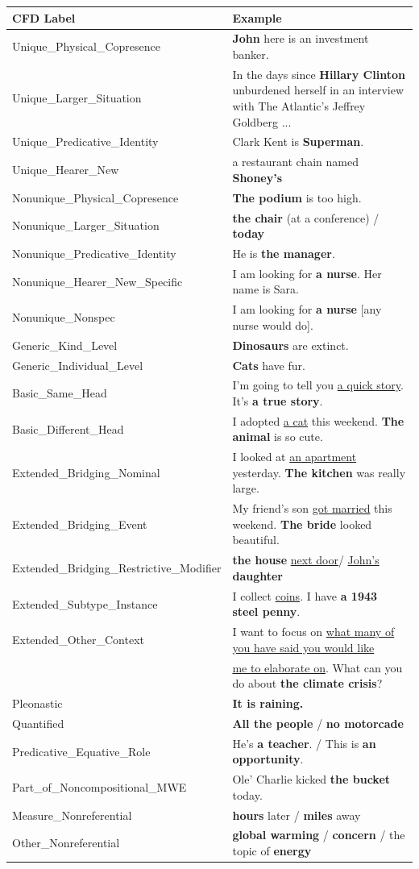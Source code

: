 \documentclass[portrait,final]{baposter}
\begin{document}
\begin{poster}
{\vspace{4pt}
\smaller[.5]
\begin{tabular}{p{19em}p{29em}}
{\bf \normalsize{CFD Label}}&{\bf \normalsize{Example}}\\\hline
Unique\_Physical\_Copresence & {\bf John} here is an investment banker.\\Unique\_Larger\_Situation & In the days since {\bf Hillary Clinton} unburdened herself in an interview with The Atlantic's Jeffrey Goldberg ...\\Unique\_Predicative\_Identity & Clark Kent is {\bf Superman}.\\Unique\_Hearer\_New & a restaurant chain named {\bf Shoney's}\\Nonunique\_Physical\_Copresence & {\bf The podium} is too high.\\Nonunique\_Larger\_Situation & {\bf the chair} (at a conference) / {\bf today}\\Nonunique\_Predicative\_Identity & He is {\bf the manager}.\\Nonunique\_Hearer\_New\_Specific & I am looking for {\bf a nurse}. Her name is Sara.\\Nonunique\_Nonspec & I am looking for {\bf a nurse} [any nurse would do].\\Generic\_Kind\_Level & {\bf Dinosaurs} are extinct.\\Generic\_Individual\_Level & {\bf Cats} have fur.\\Basic\_Same\_Head & I'm going to tell you \underline{a quick story}. It's {\bf a true story}.\\Basic\_Different\_Head & I adopted \underline{a cat} this weekend. {\bf The animal} is so cute.\\Extended\_Bridging\_Nominal & I looked at \underline{an apartment} yesterday. {\bf The kitchen} was really large.\\Extended\_Bridging\_Event & My friend's son \underline{got married} this weekend. {\bf The bride} looked beautiful.\\Extended\_Bridging\_Restrictive\_Modifier & {\bf the house} \underline{next door}/ \underline{John's} {\bf daughter}\\Extended\_Subtype\_Instance & I collect \underline{coins}. I have {\bf a 1943 steel penny}.\\Extended\_Other\_Context & I want to focus on \underline{what many of you have said you would like}\\
& \underline{me to elaborate on}. What can you do about {\bf the climate crisis}?\\Pleonastic & {\bf It is raining.}\\Quantified & {\bf All the people} / {\bf no motorcade}\\Predicative\_Equative\_Role & He's {\bf a teacher}. / This is {\bf an opportunity}.\\Part\_of\_Noncompositional\_MWE & Ole' Charlie kicked {\bf the bucket} today.\\Measure\_Nonreferential & {\bf hours} later / {\bf miles} away\\Other\_Nonreferential & {\bf global warming} / {\bf concern} / the topic of {\bf energy} 

\end{tabular}}
\end{poster}
\end{document}
